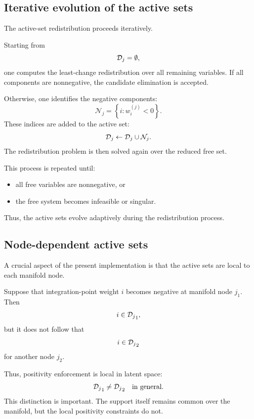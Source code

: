 \documentclass[11pt,a4paper]{article}
\begin{document}
\subsection{Iterative evolution of the active sets}

The active-set redistribution proceeds iteratively.

Starting from
\[
        \mathcal{D}_j=\emptyset,
\]
one computes the least-change redistribution over all remaining variables. If
all components are nonnegative, the candidate elimination is accepted.

Otherwise, one identifies the negative components:
\[
        \mathcal{N}_j
        =
        \left\{
        i:
        w_i^{(j)}<0
        \right\}.
\]
These indices are added to the active set:
\[
        \mathcal{D}_j
        \gets
        \mathcal{D}_j\cup\mathcal{N}_j.
\]
The redistribution problem is then solved again over the reduced free set.

This process is repeated until:
\begin{itemize}
    \item all free variables are nonnegative, or
    \item the free system becomes infeasible or singular.
\end{itemize}

Thus, the active sets evolve adaptively during the redistribution process.

\subsection{Node-dependent active sets}

A crucial aspect of the present implementation is that the active sets are local
to each manifold node.

Suppose that integration-point weight $i$ becomes negative at manifold node
$j_1$. Then
\[
        i\in{\mathcal{D}_j}_1,
\]
but it does not follow that
\[
        i\in{\mathcal{D}_j}_2
\]
for another node $j_2$.

Thus, positivity enforcement is local in latent space:
\[
        {\mathcal{D}_j}_1 \neq {\mathcal{D}_j}_2
        \quad\text{in general}.
\]
This distinction is important. The support itself remains common over the
manifold, but the local positivity constraints do not.
\end{document}
